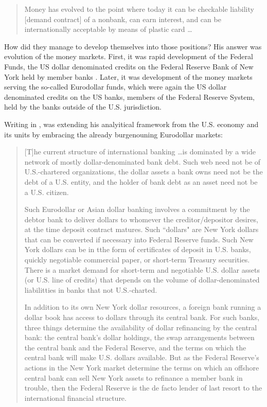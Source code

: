 \begin{quote}
Money has evolved to the point where today it can be checkable liability [demand contract] of a nonbank, can earn interest, and can be internationally acceptable by means of plastic card \dots~\citep[p.~13]{minsky1985_}
\end{quote} 

How did they manage to develop themselves into those positions? His answer was evolution of the money markets. First, it was rapid development of the Federal Funds, the US dollar denominated credits on the Federal Reserve Bank of New York held by member banks \citep{minsky1957}. Later, it was development of the money markets serving the so-called Eurodollar funds, which were again the US dollar denominated credits on the US banks, members of the Federal Reserve System, held by the banks outside of the U.S. jurisdiction.

Writing in \citeyear{minsky1985_}, \citeauthor{minsky1985_} was extending his analyitical framework from the U.S. economy and its units by embracing the already burgenouning Eurodollar markets:

\begin{quote}
[T]he current structure of international banking \dots is dominated by a wide network of mostly dollar-denominated bank debt. Such web need not be of U.S.-chartered organizations, the dollar assets a bank owns need not be the debt of a U.S. entity, and the holder of bank debt as an asset need not be a U.S. citizen.\par Such Eurodollar or Asian dollar banking involves a commitment by the debtor bank to deliver dollars to whomever the creditor/depositor desires, at the time deposit contract matures. Such ``dollars" are New York dollars that can be converted if necessary into Federal Reserve funds. Such New York dollars can be in tthe form of certificates of deposit in U.S. banks, quickly negotiable commercial paper, or short-term Treasury securities. There is a market demand for short-term and negotiable U.S. dollar assets (or U.S. line of credits) that depends on the volume of dollar-denominated liabilitties in banks that not U.S.-charted.\par In addition to its own New York dollar resources, a foreign bank running a dollar book has access to dollars through its central bank. For such banks, three things determine the availability of dollar refinancing by the central bank: the central bank's dollar holdings, the swap arrangements between the central bank and the Federal Reserve, and the terms on which the central bank will make U.S. dollars available. But as the Federal Reserve's actions in the New York market determine the terms on which an offshore central bank can sell New York assets to refinance a member bank in trouble, then the Federal Reserve is the de facto lender of last resort to the international financial structure.~\citep[p.~15]{minsky1985_}
\end{quote}

